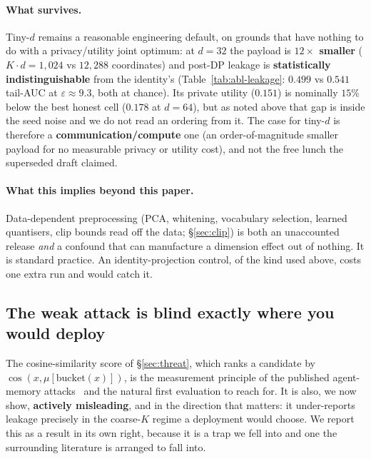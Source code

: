 \documentclass[pdflatex,sn-mathphys-num,iicol]{sn-jnl}
\theoremstyle{thmstyleone}%
\theoremstyle{thmstyletwo}%
\theoremstyle{thmstylethree}%
\newcommand{\eps}{\varepsilon}
\newcommand{\secref}[1]{\S\ref{#1}}
\begin{document}
\paragraph{What survives.} Tiny-$d$ remains a reasonable engineering default, on grounds
that have nothing to do with a privacy/utility joint optimum: at $d = 32$ the payload is
\textbf{$12\times$ smaller} ($K \cdot d = 1{,}024$ vs $12{,}288$ coordinates) and post-DP
leakage is \textbf{statistically indistinguishable} from the identity's
(Table~\ref{tab:abl-leakage}: $0.499$ vs $0.541$ tail-AUC at $\eps \approx 9.3$, both at
chance). Its private utility ($0.151$) is nominally $15\%$ below the best honest cell
($0.178$ at $d = 64$), but as noted above that gap is inside the seed noise and we do not
read an ordering from it. The case for tiny-$d$ is therefore a \textbf{communication/compute}
one (an order-of-magnitude smaller payload for no measurable privacy or utility cost),
and not the free lunch the superseded draft claimed.

\paragraph{What this implies beyond this paper.} Data-dependent preprocessing (PCA,
whitening, vocabulary selection, learned quantisers, clip bounds read off the data;
\secref{sec:clip}) is both an unaccounted release \emph{and} a confound that can
manufacture a dimension effect out of nothing. It is standard practice. An
identity-projection control, of the kind used above, costs one extra run and would catch it.

\subsection{The weak attack is blind exactly where you would deploy}\label{sec:proxy-blind}

The cosine-similarity score of \secref{sec:threat}, which ranks a candidate by
$\cos(x, \mu[\mathrm{bucket}(x)])$, is the measurement principle of the published
agent-memory attacks~\cite{wang2025mextra, chen2026mrmmia} and the natural first
evaluation to reach for. It is also, we now show, \textbf{actively misleading}, and in the
direction that matters: it under-reports leakage precisely in the coarse-$K$ regime a
deployment would choose. We report this as a result in its own right, because it is a trap
we fell into and one the surrounding literature is arranged to fall into.
\end{document}
